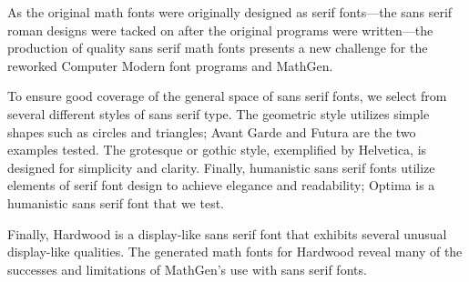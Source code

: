
As the original math fonts were originally designed as serif fonts---the sans
serif roman designs were tacked on after the original programs were
written---the production of quality sans serif math fonts presents a new
challenge for the reworked Computer Modern font programs and MathGen.

To ensure good coverage of the general space of sans serif fonts, we select from
several different styles of sans serif type. The geometric style utilizes simple
shapes such as circles and triangles; Avant Garde and Futura are the two
examples tested. The grotesque or gothic style, exemplified by Helvetica, is
designed for simplicity and clarity. Finally, humanistic sans serif fonts
utilize elements of serif font design to achieve elegance and readability;
Optima is a humanistic sans serif font that we test.

Finally, Hardwood is a display-like sans serif font that exhibits several
unusual display-like qualities. The generated math fonts for Hardwood reveal
many of the successes and limitations of MathGen's use with sans serif fonts.
